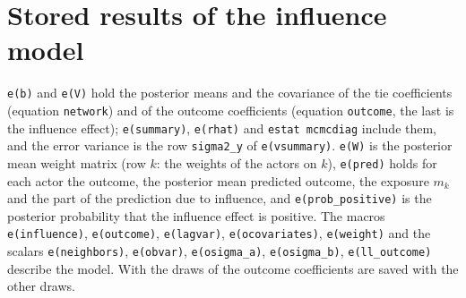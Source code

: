 \section{Stored results of the influence model}

\texttt{e(b)} and \texttt{e(V)} hold the posterior means and the covariance of the tie coefficients (equation \texttt{network}) and of the outcome coefficients (equation \texttt{outcome}, the last is the influence effect); \texttt{e(summary)}, \texttt{e(rhat)} and \texttt{estat mcmcdiag} include them, and the error variance is the row \texttt{sigma2\_y} of \texttt{e(vsummary)}. \texttt{e(W)} is the posterior mean weight matrix (row $k$: the weights of the actors on $k$), \texttt{e(pred)} holds for each actor the outcome, the posterior mean predicted outcome, the exposure $m_k$ and the part of the prediction due to influence, and \texttt{e(prob\_positive)} is the posterior probability that the influence effect is positive. The macros \texttt{e(influence)}, \texttt{e(outcome)}, \texttt{e(lagvar)}, \texttt{e(ocovariates)}, \texttt{e(weight)} and the scalars \texttt{e(neighbors)}, \texttt{e(obvar)}, \texttt{e(osigma\_a)}, \texttt{e(osigma\_b)}, \texttt{e(ll\_outcome)} describe the model. With  the draws of the outcome coefficients are saved with the other draws.
